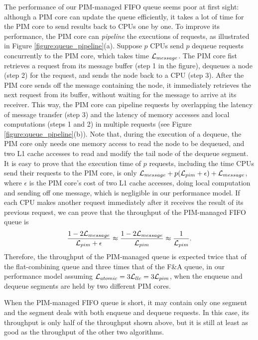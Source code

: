 The performance of our PIM-managed FIFO queue seems poor at first sight: although a PIM core can update 
the queue efficiently, it takes a lot of time for the PIM core to send results back to CPUs one by one. 
To improve its performance, the PIM core can \textit{pipeline} the executions of requests, 
as illustrated in Figure \ref{figure:queue_pipeline}(a). 
Suppose $p$ CPUs send $p$ dequeue requests concurrently to the PIM core, which takes time $\mathcal{L}_{message}$. 
The PIM core fist retrieves a request from its message buffer (step 1 in the figure), 
dequeues a node (step 2) for the request, and sends the node back to a CPU (step 3). 
After the PIM core sends off the message containing the node, it immediately retrieves the next 
request from its buffer, without waiting for the message to arrive at its receiver. 
This way, the PIM core can pipeline requests by overlapping the latency of message transfer (step 3) 
and the latency of memory accesses and local computations (steps 1 and 2) in multiple requests 
(see Figure \ref{figure:queue_pipeline}(b)). 
Note that, during the execution of a dequeue, the PIM core only needs one memory access to read the node 
to be dequeued, and two L1 cache accesses to read and modify the tail node of the dequeue segment.  
It is easy to prove that the execution time of $p$ requests, including the time CPUs send 
their requests to the PIM core, is only $\mathcal{L}_{message} + p(\mathcal{L}_{pim} + \epsilon) + \mathcal{L}_{message}$, where $\epsilon$ 
is the PIM core's cost of two L1 cache accesses, doing local computation and sending off one message, 
which is negligible in our performance model. 
If each CPU makes another request immediately after it receives the result of its previous request, 
we can prove that the throughput of the PIM-managed FIFO queue is 
$${1 - 2\mathcal{L}_{message} \over \mathcal{L}_{pim} + \epsilon} \approx {1 - 2\mathcal{L}_{message}\over \mathcal{L}_{pim}} 
\approx {1 \over \mathcal{L}_{pim}}.$$
Therefore, the throughput of the PIM-managed queue is expected twice that of the flat-combining queue
and three times that of the F\&A queue, in our performance model assuming $\mathcal{L}_{atomic} = 3\mathcal{L}_{llc} = 3\mathcal{L}_{pim}$, 
when the enqueue and dequeue segments are held by two different PIM cores. 

When the PIM-managed FIFO queue is short, it may contain only one segment and 
the segment deals with both enqueue and dequeue requests. 
In this case, its throughput is only half of the throughput shown above, 
but it is still at least as good as the throughput of the other two algorithms. 

